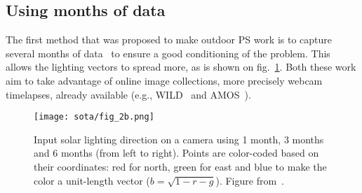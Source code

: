 \subsection{Using months of data}
\label{sota:ops-months}

The first method that was proposed to make outdoor PS work is to capture several months of data~\cite{ackermann-cvpr-12,abrams-eccv-12} to ensure a good conditioning of the problem. This allows the lighting vectors to spread more, as is shown on fig.~\ref{fig:abrams-sunpath}. Both these work aim to take advantage of online image collections, more precisely webcam timelapses, already available (e.g., WILD~\cite{narasimhan-eccv-06} and AMOS~\cite{jacobs-cvpr-2007}).

\begin{figure}
\centering
\texttt{[image: sota/fig\_2b.png]}
\caption{Input solar lighting direction on a camera using 1 month, 3 months and 6 months (from left to right). Points are color-coded based on their coordinates: red for north, green for east and blue to make the color a unit-length vector ($b = \sqrt{1 - r - g}$). Figure from~\cite{abrams-eccv-12}.}
\label{fig:abrams-sunpath}
\end{figure}

